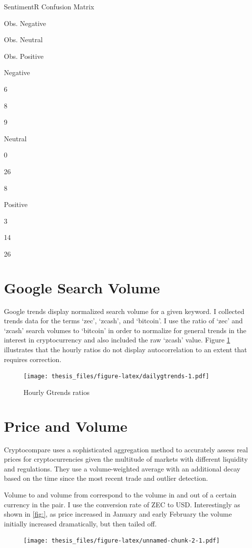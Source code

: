 \documentclass[12pt,twoside]{dukestatscithesis}
\begin{document}
\label{tab:sentimentcheck}SentimentR Confusion Matrix

Obs. Negative

Obs. Neutral

Obs. Positive

Negative

6

8

9

Neutral

0

26

8

Positive

3

14

26

\section{Google Search Volume}\label{google-search-volume}

Google trends display normalized search volume for a given keyword. I
collected trends data for the terms `zec', `zcash', and `bitcoin'. I use
the ratio of `zec' and `zcash' search volumes to `bitcoin' in order to
normalize for general trends in the interest in cryptocurrency and also
included the raw `zcash' value. Figure \ref{fig:dailygtrends}
illustrates that the hourly ratios do not display autocorrelation to an
extent that requires correction.
\begin{figure}
\centering
\texttt{[image: thesis\_files/figure-latex/dailygtrends-1.pdf]}
\caption{\label{fig:dailygtrends}Hourly Gtrends ratios}
\end{figure}
\section{Price and Volume}\label{price-and-volume}

Cryptocompare uses a sophisticated aggregation method to accurately
assess real prices for cryptocurrencies given the multitude of markets
with different liquidity and regulations. They use a volume-weighted
average with an additional decay based on the time since the most recent
trade and outlier detection.

Volume to and volume from correspond to the volume in and out of a
certain currency in the pair. I use the conversion rate of ZEC to USD.
Interestingly as shown in \ref{fig:}, as price increased in January and
early February the volume initially increased dramatically, but then
tailed off.
\begin{figure}
\centering
\texttt{[image: thesis\_files/figure-latex/unnamed-chunk-2-1.pdf]}
\caption{}
\end{figure}
\end{document}
